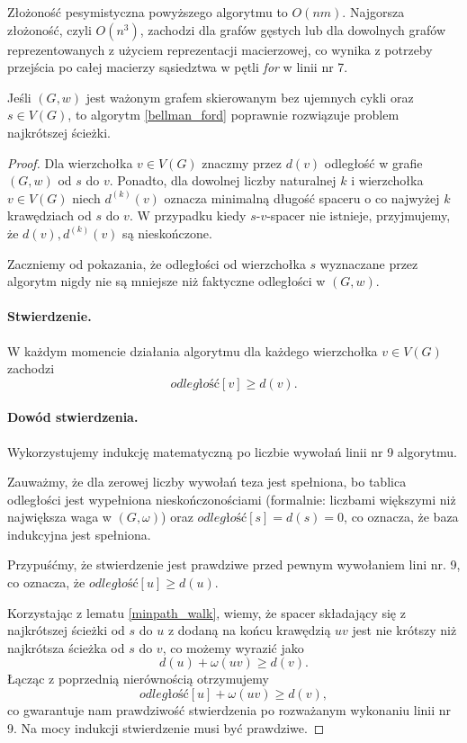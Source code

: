 Złożoność pesymistyczna powyższego algorytmu to $O(nm)$.
Najgorsza złożoność, czyli $O(n^3)$, zachodzi dla grafów 
gęstych lub dla dowolnych grafów
reprezentowanych z użyciem reprezentacji macierzowej, co wynika
z potrzeby przejścia po całej macierzy sąsiedztwa w pętli \textit{for} w linii nr 7.

\begin{theorem}
	Jeśli
	$(G, w)$ jest ważonym grafem skierowanym
	bez ujemnych cykli oraz
	$s \in V(G)$, to algorytm \ref{bellman_ford}
	poprawnie rozwiązuje problem najkrótszej ścieżki.
	\begin{proof}
		Dla wierzchołka $v \in V (G)$ znaczmy 
		przez $d(v)$ odległość w grafie
		$(G, w)$ od $s$ do $v$. 
		Ponadto, dla dowolnej liczby
		naturalnej $k$ i 
		wierzchołka $v \in V(G)$ niech 
		$d^{(k)}(v)$ oznacza minimalną długość 
		spaceru o co najwyżej $k$ krawędziach
		od $s$ do $v$. W przypadku kiedy $s$-$v$-spacer
		nie istnieje, przyjmujemy, że $d(v), d^{(k)}(v)$
		są nieskończone.
		
		Zaczniemy od pokazania, że odległości 
		od wierzchołka $s$ 
		wyznaczane przez algorytm nigdy nie są mniejsze niż
		faktyczne odległości w $(G, w)$.
		
		\paragraph{Stwierdzenie.} W każdym momencie
		działania algorytmu dla każdego wierzchołka
		$v \in V(G)$ zachodzi 
		\[\textit{odległość}[v] \geq d(v).\]
		
		\paragraph{Dowód stwierdzenia.} Wykorzystujemy
		indukcję matematyczną po liczbie wywołań linii nr 9 algorytmu. 
		
		Zauważmy, że dla zerowej liczby wywołań teza jest spełniona,
		bo tablica odległości jest wypełniona nieskończonościami 
		(formalnie: liczbami większymi niż największa waga w $(G, \omega)$)
		oraz $\textit{odległość}[s]=d(s)=0$, co oznacza, że
		baza indukcyjna jest spełniona.
		
		Przypuśćmy, że stwierdzenie jest prawdziwe przed pewnym
		wywołaniem lini nr. 9, co oznacza, że 
		$\textit{odległość}[u] \geq d(u)$. 
		
		Korzystając z lematu 
		\ref{minpath_walk}, wiemy, że spacer składający 
		się z najkrótszej ścieżki od $s$ do $u$ z dodaną 
		na końcu krawędzią $uv$ jest nie krótszy niż 
		najkrótsza ścieżka od $s$ do $v$, co możemy 
		wyrazić jako
		\[d(u) + \omega(uv) \geq d(v).\]
		Łącząc z poprzednią nierównością otrzymujemy
		\[\textit{odległość}[u] + \omega(uv) \geq d(v),\]
		co gwarantuje nam prawdziwość stwierdzenia po 
		rozważanym wykonaniu linii nr 9. Na mocy indukcji stwierdzenie musi być prawdziwe.
		

\end{proof}
\end{theorem}

